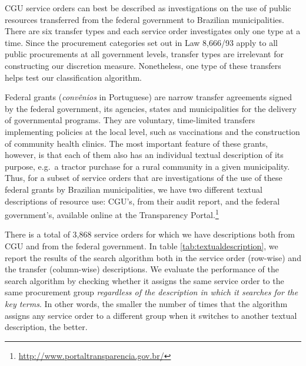 \documentclass[11pt]{article}
\begin{document}
CGU service orders can best be described as investigations on the use of
public resources transferred from the federal government to Brazilian
municipalities. There are six transfer types and each service order
investigates only one type at a time. Since the procurement categories
set out in Law 8,666/93 apply to all public procurements at all
government levels, transfer types are irrelevant for constructing our
discretion measure. Nonetheless, one type of these transfers helps test
our classification algorithm.

Federal grants (\emph{convênios} in Portuguese) are narrow transfer
agreements signed by the federal government, its agencies, states and
municipalities for the delivery of governmental programs. They are
voluntary, time-limited transfers implementing policies at the local
level, such as vaccinations and the construction of community health
clinics. The most important feature of these grants, however, is that
each of them also has an individual textual description of its purpose,
e.g.~a tractor purchase for a rural community in a given municipality.
Thus, for a subset of service orders that are investigations of the use
of these federal grants by Brazilian municipalities, we have two
different textual descriptions of resource use: CGU's, from their audit
report, and the federal government's, available online at the
Transparency Portal.\footnote{\url{http://www.portaltransparencia.gov.br/}}



There is a total of 3,868 service orders for which we have descriptions both from CGU and from the federal government. In table \ref{tab:textualdescription}, we report the results of the search algorithm both in the service order (row-wise) and the transfer (column-wise) descriptions. We evaluate the performance of the search algorithm by checking whether it assigns the same service order to the same procurement group \emph{regardless of the description in which it searches for the key terms}. In other words, the smaller the number of times that the algorithm assigns any service order to a different group when it switches to another textual description, the better.
\end{document}
